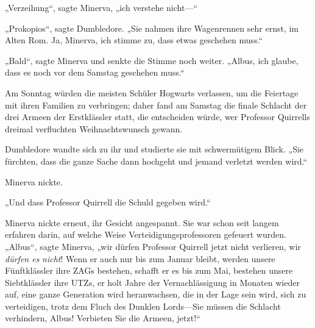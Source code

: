 „Verzeihung“, sagte Minerva, „ich verstehe nicht—“

„Prokopios“, sagte Dumbledore. „Sie nahmen ihre Wagenrennen sehr ernst, im Alten Rom. Ja, Minerva, ich stimme zu, dass etwas geschehen muss.“

„Bald“, sagte Minerva und senkte die Stimme noch weiter. „Albus, ich glaube, dass es noch vor dem Samstag geschehen muss.“

Am Sonntag würden die meisten Schüler Hogwarts verlassen, um die Feiertage mit ihren Familien zu verbringen; daher fand am Samstag die finale Schlacht der drei Armeen der Erstklässler statt, die entscheiden würde, wer Professor Quirrells dreimal verfluchten Weihnachtswunsch gewann.

Dumbledore wandte sich zu ihr und studierte sie mit schwermütigem Blick. „Sie fürchten, dass die ganze Sache dann hochgeht und jemand verletzt werden wird.“

Minerva nickte.

„Und dass Professor Quirrell die Schuld gegeben wird.“

Minerva nickte erneut, ihr Gesicht angespannt. Sie war schon seit langem erfahren darin, auf welche Weise Verteidigungsprofessoren gefeuert wurden. „Albus“, sagte Minerva, „wir dürfen Professor Quirrell jetzt nicht verlieren, wir \emph{dürfen es} \emph{nicht}! Wenn er auch nur bis zum Januar bleibt, werden unsere Fünftklässler ihre ZAGs bestehen, schafft er es bis zum Mai, bestehen unsere Siebtklässler ihre UTZs, er holt Jahre der Vernachlässigung in Monaten wieder auf, eine ganze Generation wird heranwachsen, die in der Lage sein wird, sich zu verteidigen, trotz dem Fluch des Dunklen Lords—Sie müssen die Schlacht verhindern, Albus! Verbieten Sie die Armeen, jetzt!“

